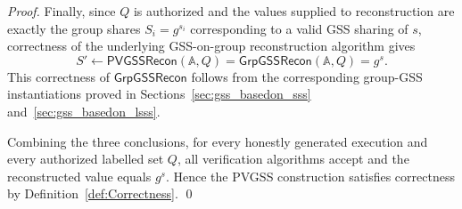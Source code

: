 \documentclass[runningheads]{llncs}
\newcommand{\ggssrecon}{\mathsf{GrpGSSRecon}}
\newcommand{\pvgssRecon}{\mathsf{PVGSSRecon}}
\begin{document}
\begin{proof}
  Finally, since \(Q\) is authorized and the values supplied to
  reconstruction are
  exactly the group shares \(S_i=g^{s_i}\) corresponding to a valid
  GSS sharing of
  \(s\), correctness of the underlying GSS-on-group reconstruction
  algorithm gives
  \[
      S' \gets \pvgssRecon(\mathbb{A},Q)
         = \ggssrecon(\mathbb{A},Q)
         = g^s .
  \]
  This correctness of \(\ggssrecon\) follows from the corresponding
  group-GSS
  instantiations proved in Sections~\ref{sec:gss_basedon_sss}
  and~\ref{sec:gss_basedon_lsss}.

  Combining the three conclusions, for every honestly generated
  execution and
  every authorized labelled set \(Q\), all verification algorithms
  accept and the
  reconstructed value equals \(g^s\). Hence the PVGSS construction satisfies correctness by Definition~\ref{def:Correctness}.
\qed
  \end{proof}
\end{document}
